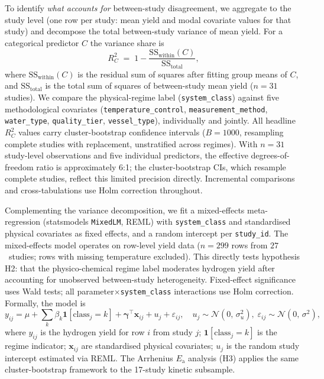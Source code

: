 To identify \emph{what accounts for} between-study disagreement, we aggregate to the study
level (one row per study: mean yield and modal covariate values for that study) and
decompose the total between-study variance of mean yield. For a categorical predictor
$C$ the variance share is
\begin{equation}
R^2_C \;=\; 1 - \frac{\mathrm{SS}_{\text{within}}(C)}{\mathrm{SS}_{\text{total}}},
\label{eq:rsq_c}
\end{equation}
where $\mathrm{SS}_{\text{within}}(C)$ is the residual sum of squares after fitting
group means of $C$, and $\mathrm{SS}_{\text{total}}$ is the total sum of squares of
between-study mean yield ($n\!=\!31$ studies). We compare the physical-regime label
(\texttt{system\_class}) against five methodological covariates
(\texttt{temperature\_control}, \texttt{measurement\_method}, \texttt{water\_type},
\texttt{quality\_tier}, \texttt{vessel\_type}), individually and jointly.
All headline $R^2_C$ values carry cluster-bootstrap confidence intervals ($B\!=\!1000$,
resampling complete studies with replacement, unstratified across regimes). With $n\!=\!31$
study-level observations and five individual predictors, the effective degrees-of-freedom
ratio is approximately 6:1; the cluster-bootstrap CIs, which resample complete studies,
reflect this limited precision directly. Incremental comparisons and cross-tabulations
use Holm correction throughout.

Complementing the variance decomposition, we fit a mixed-effects meta-regression
(statsmodels \texttt{MixedLM}, REML) with \texttt{system\_class} and standardised
physical covariates as fixed effects, and a random intercept per \texttt{study\_id}.
The mixed-effects model operates on row-level yield data ($n\!=\!299$ rows from
$27$~studies; rows with missing temperature excluded). This directly tests hypothesis
H2: that the physico-chemical regime label moderates hydrogen yield after accounting
for unobserved between-study heterogeneity. Fixed-effect significance uses Wald tests;
all parameter$\times$\texttt{system\_class} interactions use Holm correction. Formally,
the model is
\begin{equation}
y_{ij} = \mu + \sum_{k} \beta_k \mathbf{1}[\text{class}_j = k]
         + \boldsymbol{\gamma}^{\!\top}\mathbf{x}_{ij} + u_j + \varepsilon_{ij},
\quad u_j \sim \mathcal{N}(0,\,\sigma_u^2),\;\varepsilon_{ij} \sim \mathcal{N}(0,\,\sigma^2),
\label{eq:mixedlm}
\end{equation}
where $y_{ij}$ is the hydrogen yield for row $i$ from study $j$;
$\mathbf{1}[\text{class}_j = k]$ is the regime indicator; $\mathbf{x}_{ij}$ are
standardised physical covariates; $u_j$ is the random study intercept estimated via
REML. The Arrhenius $E_\mathrm{a}$ analysis (H3) applies the same cluster-bootstrap
framework to the 17-study kinetic subsample.

